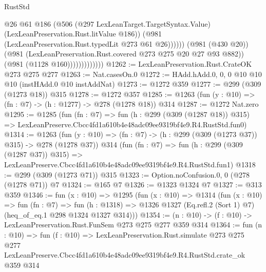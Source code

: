 \begin{lexlean}{RustStd}
\begin{coremodule}
                                  @26
                                  @61
                                  @186
                                  (@506
                                    (@297 LexLeanTarget.TargetSyntax.Value)
                                    (LexLeanPreservation.Rust.litValue @186))
                                  (@981 (LexLeanPreservation.Rust.typedLit @273 @61 @26))))))
                          (@981 (@430 @20))
                          (@981 (LexLeanPreservation.Rust.covered @273 @275 @20 @27 @93 @882))
                          (@981 (@1128 @160)))))))))))))
@1262 := LexLeanPreservation.Rust.CrateOK @273 @275 @277
@1263 := Nat.casesOn.{0}
@1272 := HAdd.hAdd.{0, 0, 0} @10 @10 @10 (instHAdd.{0} @10 instAddNat)
@1273 := @1272 @359
@1277 := @299 (@309 (@1273 @18)) @315
@1278 := @1272 @357
@1285 := @1263 (fun (y : @10) => (fn : @7) -> (h : @1277) -> @278 (@1278 @18)) @314
@1287 := @1272 Nat.zero
@1295 := @1285
    (fun (fn : @7) =>
    fun (h : @299 (@309 (@1287 @18)) @315) =>
    LexLeanPreserve.Cbcc4fd1a610b4e48adc09ee9319bf4e9.R4.RustStd.fun0)
@1314 := @1263
    (fun (y : @10) => (fn : @7) -> (h : @299 (@309 (@1273 @37)) @315) -> @278 (@1278 @37))
    @314
    (fun (fn : @7) =>
    fun (h : @299 (@309 (@1287 @37)) @315) =>
    LexLeanPreserve.Cbcc4fd1a610b4e48adc09ee9319bf4e9.R4.RustStd.fun1)
@1318 := @299 (@309 (@1273 @71)) @315
@1323 := Option.noConfusion.{0, 0} (@278 (@1278 @71)) @7
@1324 := @165 @7
@1326 := @1323 @1324 @7
@1327 := @313 @359
@1346 := fun (x : @10) =>
  @1295
    (fun (x : @10) =>
    @1314
      (fun (x : @10) =>
      fun (fn : @7) =>
      fun (h : @1318) =>
      @1326 @1327 (Eq.refl.{2} (Sort 1) @7) (heq_of_eq.{1} @298 @1324 @1327 @314)))
@1354 := (n : @10) -> (f : @10) -> LexLeanPreservation.Rust.FunSem @273 @275 @277 @359 @314
@1364 := fun (n : @10) =>
  fun (f : @10) =>
  LexLeanPreservation.Rust.simulate
    @273
    @275
    @277
    LexLeanPreserve.Cbcc4fd1a610b4e48adc09ee9319bf4e9.R4.RustStd.crate_ok
    @359
    @314
\end{coremodule}
\end{lexlean}

